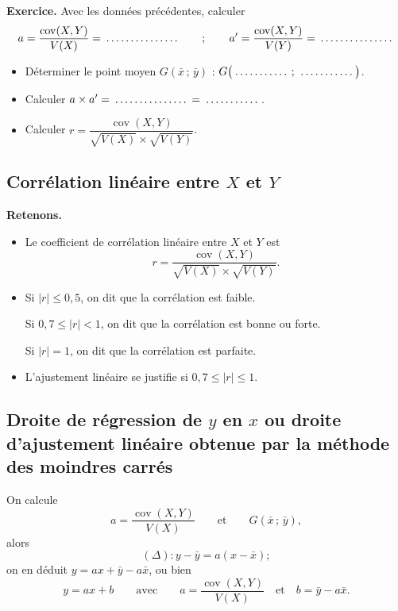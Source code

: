 \documentclass[11pt,a4paper]{article}
\newcommand{\abs}[1]{\left|#1\right|}
\newcommand{\blanc}[1][1.8cm]{\makebox[#1]{\dotfill}}
\begin{document}
\medskip
\textbf{Exercice.} Avec les données précédentes, calculer
  \[
    a = \frac{\operatorname{cov}(X,Y)}{V(X)} = \blanc[2.4cm]
    \qquad;\qquad
    a' = \frac{\operatorname{cov}(X,Y)}{V(Y)} = \blanc[2.4cm]
  \]
  \begin{itemize}
    \item Déterminer le point moyen $G(\bar{x}\,;\,\bar{y})$ :
          $G\bigl(\blanc\,;\,\blanc\bigr)$.
    \item Calculer $a \times a' = \blanc[2.4cm] = \blanc$.
    \item Calculer
          $r = \dfrac{\operatorname{cov}(X,Y)}{\sqrt{V(X)} \times \sqrt{V(Y)}}$.
  \end{itemize}

\subsection{\texorpdfstring{Corrélation linéaire entre $X$ et $Y$}{Corrélation linéaire entre X et Y}}

\textbf{Retenons.}
\begin{itemize}
    \item Le coefficient de corrélation linéaire entre $X$ et $Y$ est
          \[
            r = \frac{\operatorname{cov}(X,Y)}{\sqrt{V(X)} \times \sqrt{V(Y)}} .
          \]
    \item Si $\abs{r} \le 0{,}5$, on dit que la corrélation est faible.

          Si $0{,}7 \le \abs{r} < 1$, on dit que la corrélation est bonne ou
          forte.

          Si $\abs{r} = 1$, on dit que la corrélation est parfaite.
    \item L'ajustement linéaire se justifie si $0{,}7 \le \abs{r} \le 1$.
\end{itemize}

\subsection{\texorpdfstring{Droite de régression de $y$ en $x$ ou droite
d'ajustement linéaire obtenue par la méthode des moindres carrés}{Droite de
régression de y en x ou droite d'ajustement linéaire obtenue par la méthode des
moindres carrés}}

On calcule
\[
  a = \frac{\operatorname{cov}(X,Y)}{V(X)}
  \qquad\text{et}\qquad
  G(\bar{x}\,;\,\bar{y}),
\]
alors
\[
  (\Delta) : y - \bar{y} = a(x - \bar{x}) ;
\]
on en déduit $y = ax + \bar{y} - a\bar{x}$, ou bien
\[
  y = ax + b
  \qquad\text{avec}\qquad
  a = \frac{\operatorname{cov}(X,Y)}{V(X)}
  \quad\text{et}\quad
  b = \bar{y} - a\bar{x} .
\]
\end{document}
